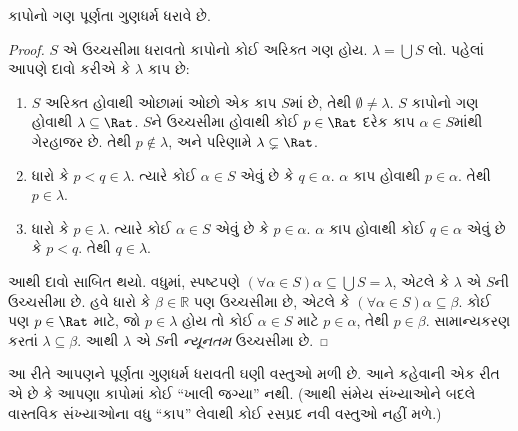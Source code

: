\documentclass[../../../include/open-logic-section]{subfiles}
\begin{document}
\begin{thm}
કાપોનો ગણ પૂર્ણતા ગુણધર્મ ધરાવે છે.
\end{thm}

\begin{proof}
$S$ એ ઉચ્ચસીમા ધરાવતો કાપોનો કોઈ અરિક્ત ગણ હોય. $\lambda = \bigcup S$ લો.
પહેલાં આપણે દાવો કરીએ કે $\lambda$ કાપ છે:
\begin{enumerate}
\item $S$ અરિક્ત હોવાથી ઓછામાં ઓછો એક કાપ $S$માં છે, તેથી
$\emptyset \neq \lambda$. $S$ કાપોનો ગણ હોવાથી $\lambda
\subseteq \Rat$. $S$ને ઉચ્ચસીમા હોવાથી કોઈ $p \in \Rat$ દરેક કાપ
$\alpha \in S$માંથી ગેરહાજર છે. તેથી $p\notin \lambda$, અને પરિણામે
$\lambda \subsetneq \Rat$.
\item ધારો કે $p < q \in \lambda$. ત્યારે કોઈ $\alpha \in S$ એવું
છે કે $q \in \alpha$. $\alpha$ કાપ હોવાથી $p \in \alpha$. તેથી
$p \in \lambda$.
\item ધારો કે $p \in \lambda$. ત્યારે કોઈ $\alpha \in S$ એવું છે કે
$p \in \alpha$. $\alpha$ કાપ હોવાથી કોઈ $q \in \alpha$ એવું છે કે
$p < q$. તેથી $q \in \lambda$.
\end{enumerate}
આથી દાવો સાબિત થયો. વધુમાં, સ્પષ્ટપણે $(\forall \alpha \in S)\alpha
\subseteq \bigcup S = \lambda$, એટલે કે $\lambda$ એ $S$ની ઉચ્ચસીમા
છે. હવે ધારો કે $\beta \in \mathbb{R}$ પણ ઉચ્ચસીમા છે, એટલે કે
$(\forall \alpha \in S)\alpha \subseteq \beta$. કોઈ પણ $p \in \Rat$
માટે, જો $p \in \lambda$ હોય તો કોઈ $\alpha \in S$ માટે
$p \in \alpha$, તેથી $p \in \beta$. સામાન્યકરણ કરતાં
$\lambda \subseteq \beta$. આથી $\lambda$ એ $S$ની \emph{ન્યૂનતમ}
ઉચ્ચસીમા છે.
\end{proof}

આ રીતે આપણને પૂર્ણતા ગુણધર્મ ધરાવતી ઘણી વસ્તુઓ મળી છે. આને કહેવાની
એક રીત એ છે કે આપણા કાપોમાં કોઈ ``ખાલી જગ્યા'' નથી. (આથી સંમેય
સંખ્યાઓને બદલે વાસ્તવિક સંખ્યાઓના વધુ ``કાપ'' લેવાથી કોઈ રસપ્રદ નવી
વસ્તુઓ નહીં મળે.)
\end{document}
